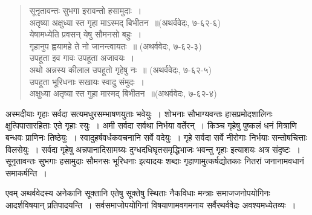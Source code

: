 {\begin{verse}
{सूनृतावन्तः सुभगा इरावन्तो हसामुदाः~। }\\
{अतृष्या अक्षुध्या स्त गृहा माऽस्मद् बिभीतन~॥}(अथर्ववेदः, ७-६२-६)\\
{येषामध्येति प्रवसन् येषु सौमनसो बहुः~। }\\
{गृहानुप ह्वयामहे ते नो जानन्त्वायतः~॥} (अथर्ववेदः, ७-६२-३)\\
{उपहूता इव गावः उपहूता अजावयः~। }\\
{अथो अन्नस्य कीलाल उपहूतो गृहेषु नः~॥} (अथर्ववेदः, ७-६२-५)\\
{उपहूता भूरिधनाः सखायः स्वादु संमुदः~। }\\
{अक्षुध्या अतृष्या स्त गुहा मास्मद् बिभीतन~॥}(अथर्ववेदः, ७-६२-४)
\end{verse}

अस्मदीयाः गृहाः सर्वदा सत्यमधुरसम्भाषणयुताः भवेयुः~। शोभनाः सौभाग्यवन्तः हासप्रमोदशालिनः क्षुत्पिपासारहिताः एते गृहाः स्युः~। अमी सर्वदा सर्वथा निर्भया वर्तेरन्~। किञ्च गृहेषु पुष्कलं धनं मित्राणि बन्धवः प्राणिनः तिष्ठेयुः~। स्वादुहर्षवर्धकवचनानि सर्वे वदेयुः~। गृहे सर्वदा सर्वे नीरोगाः निर्भयाः सन्तोषचित्ताः विलसेयुः~। सर्वदा गृहेषु अन्नपानादिसामग्र्यः दुग्धदधिघृतसमृद्धिभाजः भवन्तु गृहाः इत्याशयः अत्र संदृष्टः~। सूनृतावन्तः सुभगाः हसामुदाः सौमनसः भूरिधनाः इत्यादयः शब्दाः गृहाणामुत्कर्षद्योतकाः नितरां जनानामवधानं समाकर्षन्ति~। 

एवम् अथर्ववेदस्य अनेकानि सूक्तानि एतेषु सूक्तेषु स्थिताः नैकविधाः मन्त्राः समाज\-जनोपयोगिनः आदर्शविषयान् प्रतिपादयन्ति~। सर्वसमाजोपयोगिनां विषयाणामवगमनाय सर्वैरथर्ववेदः अवश्यमध्येतव्यः~। 

\articleend
}

